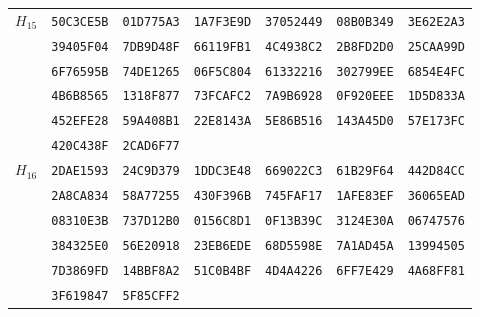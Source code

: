 \begin{table}
\begin{tabular}{@{}ccccccc@{}}
\midrule
\multirow{6}{*}{$H_{15}$}
 & \texttt{50C3CE5B} & \texttt{01D775A3} & \texttt{1A7F3E9D} & \texttt{37052449} & \texttt{08B0B349} & \texttt{3E62E2A3}\\
 & \texttt{39405F04} & \texttt{7DB9D48F} & \texttt{66119FB1} & \texttt{4C4938C2} & \texttt{2B8FD2D0} & \texttt{25CAA99D}\\
 & \texttt{6F76595B} & \texttt{74DE1265} & \texttt{06F5C804} & \texttt{61332216} & \texttt{302799EE} & \texttt{6854E4FC}\\
 & \texttt{4B6B8565} & \texttt{1318F877} & \texttt{73FCAFC2} & \texttt{7A9B6928} & \texttt{0F920EEE} & \texttt{1D5D833A}\\
 & \texttt{452EFE28} & \texttt{59A408B1} & \texttt{22E8143A} & \texttt{5E86B516} & \texttt{143A45D0} & \texttt{57E173FC}\\
 & \texttt{420C438F} & \texttt{2CAD6F77}\\

\midrule
\multirow{6}{*}{$H_{16}$}
 & \texttt{2DAE1593} & \texttt{24C9D379} & \texttt{1DDC3E48} & \texttt{669022C3} & \texttt{61B29F64} & \texttt{442D84CC}\\
 & \texttt{2A8CA834} & \texttt{58A77255} & \texttt{430F396B} & \texttt{745FAF17} & \texttt{1AFE83EF} & \texttt{36065EAD}\\
 & \texttt{08310E3B} & \texttt{737D12B0} & \texttt{0156C8D1} & \texttt{0F13B39C} & \texttt{3124E30A} & \texttt{06747576}\\
 & \texttt{384325E0} & \texttt{56E20918} & \texttt{23EB6EDE} & \texttt{68D5598E} & \texttt{7A1AD45A} & \texttt{13994505}\\
 & \texttt{7D3869FD} & \texttt{14BBF8A2} & \texttt{51C0B4BF} & \texttt{4D4A4226} & \texttt{6FF7E429} & \texttt{4A68FF81}\\
 & \texttt{3F619847} & \texttt{5F85CFF2}\\

\bottomrule
\end{tabular}
\end{table}

